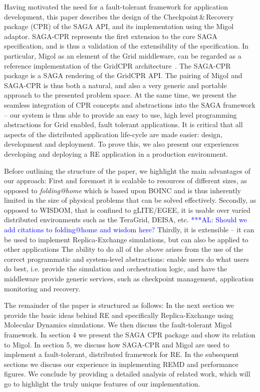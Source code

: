 \documentclass[times, 10pt, twocolumn]{article}
\newcommand{\alnote}[1]{ {\textcolor{blue} { ***AL: #1 }}}
\newcommand{\jhanote}[1]{ {\textcolor{red} { ***SJ: #1 }}}
\newcommand{\alnote}[1]{}
\newcommand{\jhanote}[1]{}
\begin{document}
Having motivated the need for a fault-tolerant framework for
application development, this paper describes the design of the
Checkpoint\,\&\,Recovery package (CPR) of the SAGA API, and its
implementation using the Migol adaptor. SAGA-CPR represents the first
extension to the core SAGA specification, and is thus a validation of
the extensibility of the specification.  In particular, Migol as an
element of the Grid middleware, can be regarded as a reference
implementation of the GridCPR architecture~\cite{ogf_cpr_arch}.  
The SAGA-CPR package is a SAGA rendering of
the GridCPR API.%
The pairing of Migol and SAGA-CPR is thus both a natural, and also a very generic and
portable approach to the presented problem space.  At the same time,
we present the seamless integration of CPR concepts and abstractions
into the SAGA framework -- our system is thus able to provide an easy to
use, high level programming abstractions for Grid enabled, fault
tolerant applications.  It is critical that all aspects of the
distributed application life-cycle are made easier: design, development
and deployment. To prove this, we also present our experiences developing
and deploying a RE application in a production environment.

Before outlining the structure of the paper, we highlight the main
advantages of our approach: First and foremost it is scalable to
resources of different sizes, as opposed to {\it folding@home}
which is based upon BOINC and is thus inherently limited in the size of
physical problems that can be solved effectively. Secondly, as opposed
to WISDOM, that is confined to gLITE/EGEE, it is usable over varied
distributed environments such as the TeraGrid, DEISA, etc.
\alnote{Should we add citations to folding@home and wisdom here?} 
Thirdly, it is extensible -- it can be used to implement Replica-Exchange simulations, 
but can also be applied to other applications
The ability to do all of the above arises from the use of the
correct programmatic and system-level abstractions: enable users do
what users do best,%
i.e. provide the simulation and orchestration logic, and 
have the middleware provide generic services,
such as checkpoint management, application monitoring and recovery.

The remainder of the paper is structured as follows: In the next
section we provide the basic ideas behind RE and specifically
Replica-Exchange using Molecular Dynamics simulations.  We then
discuss the fault-tolerant Migol framework. In section 4 we present
the SAGA CPR package and show its relation to Migol. In section 5,
we discuss how SAGA-CPR and Migol are used to implement a
fault-tolerant, distributed framework for RE. In the subsequent sections
we discuss our experience in implementing REMD and performance
figures. We conclude by providing a detailed analysis of related work,
which will go to highlight the truly unique features of our
implementation.
\end{document}
